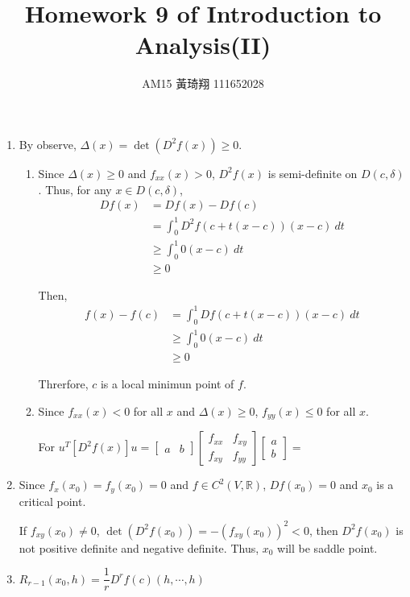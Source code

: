 \documentclass[12pt]{article}
\title{Homework 9 of Introduction to Analysis(II)}
\author{AM15 黃琦翔 111652028}
\begin{document}
\maketitle
\begin{enumerate}
    \item By observe, $\Delta(x) = \det(D^2f(x))\geq 0$.
    \begin{enumerate}
        \item Since $\Delta(x) \geq 0$ and $f_{xx}(x) > 0$, $D^2f(x)$ is semi-definite on $D(c, \delta)$.
        Thus, for any $x \in D(c, \delta)$, \begin{align*}
            Df(x) &= Df(x) - Df(c)\\
            &= \int_{0}^{1} D^2f(c+t(x-c))(x-c)\ dt\\
            &\geq \int_{0}^{1} 0(x-c)\ dt\\
            &\geq 0
        \end{align*}
        
        Then, \begin{align*}
            f(x) - f(c) &= \int_{0}^1 Df(c + t(x-c))(x-c)\ dt\\
            &\geq \int_{0}^{1} 0(x-c)\ dt\\
            &\geq 0
        \end{align*}

        Threrfore, $c$ is a local minimun point of $f$. 

        \item Since $f_{xx}(x) < 0$ for all $x$ and $\Delta(x) \geq 0$, $f_{yy}(x) \leq 0$ for all $x$.
        
        For $u^T[D^2f(x)]u = \begin{bmatrix}
            a & b
        \end{bmatrix} \begin{bmatrix}
            f_{xx} & f_{xy}\\
            f_{xy} & f_{yy}
        \end{bmatrix}\begin{bmatrix}
            a \\ b
        \end{bmatrix} = $

    \end{enumerate}

    \item Since $f_x(x_0) = f_y(x_0) = 0$ and $f \in C^2(V, \mathbb{R})$, $Df(x_0) = 0$ and $x_0$ is a critical point.
    
    If $f_{xy}(x_0)\neq 0$, $\det(D^2f(x_0)) = - (f_{xy}(x_0))^2 < 0$, then $D^2f(x_0)$ is not positive definite and negative definite.
    Thus, $x_0$ will be saddle point.

    \item $R_{r-1}(x_0, h) = \dfrac{1}{r}D^rf(c)(h, \cdots, h)$
\end{enumerate}
\end{document}
